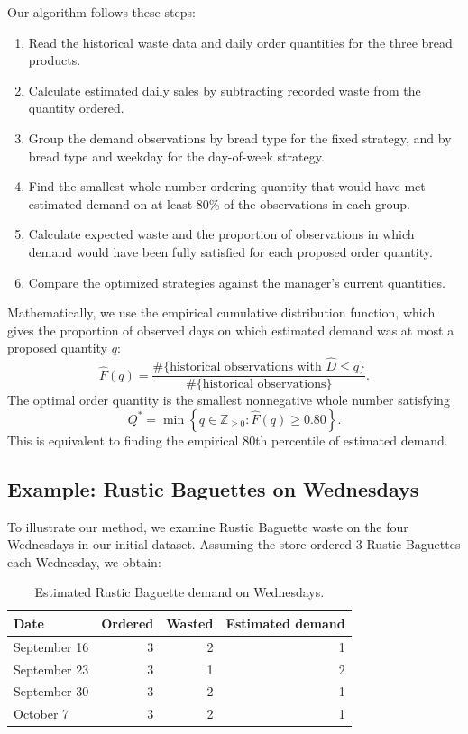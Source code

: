 \documentclass[11pt]{article}
\begin{document}
Our algorithm follows these steps:
\begin{enumerate}
\item Read the historical waste data and daily order quantities for the three bread products.
\item Calculate estimated daily sales by subtracting recorded waste from the quantity ordered.
\item Group the demand observations by bread type for the fixed strategy, and by bread type and weekday for the day-of-week strategy.
\item Find the smallest whole-number ordering quantity that would have met estimated demand on at least 80\% of the observations in each group.
\item Calculate expected waste and the proportion of observations in which demand would have been fully satisfied for each proposed order quantity.
\item Compare the optimized strategies against the manager's current quantities.
\end{enumerate}

Mathematically, we use the empirical cumulative distribution function, which gives the proportion of observed days on which estimated demand was at most a proposed quantity $q$:
\begin{equation}
\widehat F(q)=\frac{\#\{\text{historical observations with }\widehat D\le q\}}{\#\{\text{historical observations}\}}.
\label{eq:ecdf}
\end{equation}
The optimal order quantity is the smallest nonnegative whole number satisfying
\begin{equation}
\boxed{Q^*=\min\left\{q\in\mathbb{Z}_{\ge 0}:\widehat F(q)\ge 0.80\right\}.}
\label{eq:quantile}
\end{equation}
This is equivalent to finding the empirical 80th percentile of estimated demand.

\subsection{Example: Rustic Baguettes on Wednesdays}

To illustrate our method, we examine Rustic Baguette waste on the four Wednesdays in our initial dataset. Assuming the store ordered 3 Rustic Baguettes each Wednesday, we obtain:

\begin{table}[htbp]
\centering
\caption{Estimated Rustic Baguette demand on Wednesdays.}
\begin{tabular}{@{}lrrr@{}}
\toprule
Date & Ordered & Wasted & Estimated demand \\
\midrule
September 16 & 3 & 2 & 1 \\
September 23 & 3 & 1 & 2 \\
September 30 & 3 & 2 & 1 \\
October 7 & 3 & 2 & 1 \\
\bottomrule
\end{tabular}
\end{table}
\end{document}
